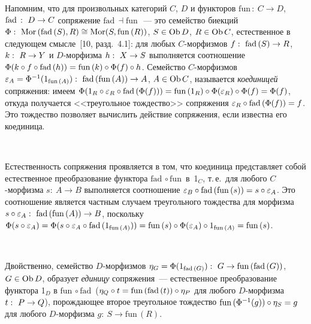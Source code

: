 \begin{multicols}{2}
 Напомним, что для произвольных категорий $C$, $D$ и функторов $\mathrm{fun}\,:\ C\to
D$, $\mathrm{fad}\,:\ D \hm\to C$ сопряжение $\mathrm{fad}\, \dashv \mathrm{fun}\,$~--- это семейство биекций
$\Phi:\ \mathrm{Mor}\,(\mathrm{fad}\,(S), R) \hm\cong \mathrm{Mor}(S, \mathrm{fun}\,(R))$, $S \hm\in
\mathrm{Ob}\, D$, $R\hm\in \mathrm{Ob}\, C$, естественное в следующем
смысле~[10, разд.~4.1]: для любых $C$-мор\-физ\-мов $f:\ \mathrm{fad}\,(S) \hm\to R$,
$k:\ R \hm\to
Y$ и $D$-мор\-физ\-ма $h:\ X \hm\to S$ выполняется соотношение $\Phi (k \circ f
\circ \mathrm{fad}\,(h)) \hm= \mathrm{fun}\,(k) \circ \Phi (f) \circ h$.
Семейство \mbox{$C$-мор}\-физ\-мов
$\varepsilon_A\hm= \Phi^{-1}(1_{\mathrm{fun}\,(A)}):\ \mathrm{fad}\,(\mathrm{fun}\,(A)) \hm\to A$, $A\hm\in
\mathrm{Ob}\, C$, называется \textit{коединицей} сопряжения: имеем $\Phi (1_R
\circ \varepsilon_R\circ \mathrm{fad}\,(\Phi (f))) \hm= \mathrm{fun}\,(1_R) \circ \Phi (\varepsilon_R) \circ
\Phi (f) \hm= \Phi (f)$, откуда получается <<треугольное тождество>>
сопряжения $\varepsilon_R \circ \mathrm{fad}\,(\Phi (f)) \hm= f$. Это тождество позволяет
вычислить действие сопряжения, если известна его коединица.

\vspace*{-6pt}
 \begin{center}
 \mbox{%
 \epsfxsize=44.07mm
 }
 \end{center}
 \vspace*{-6pt}


 Естественность сопряжения проявляется в том, что коединица представляет
собой естественное преобразование функтора $\mathrm{fad}\, \circ \mathrm{fun}\,$ в~1$_C$, т.\,е.\ для
любого $C$-мор\-физ\-ма $s:\ A \to B$ выполняется соотношение $\varepsilon_B
\circ \mathrm{fad}\,(\mathrm{fun}\,(s)) \hm= s \circ \varepsilon_A$. Это соотношение является частным
случаем треугольного тождества для морфизма $s \circ \varepsilon_A:\
\mathrm{fad}\,(\mathrm{fun}\,(A)) \hm\to B$, поскольку $\Phi (s \circ \varepsilon_A) \hm= \Phi (s \circ
\varepsilon_A \circ \mathrm{fad}\,(1_{\mathrm{fun}\,(A)})) \hm= \mathrm{fun}\,(s) \circ \Phi (\varepsilon_A) \circ
1_{\mathrm{fun}\,(A)}\hm = \mathrm{fun}\,(s)$.


\vspace*{-6pt}
 \begin{center}
 \mbox{%
 \epsfxsize=52.863mm
 }
 \end{center}
 \vspace*{-6pt}


 Двойственно, семейство $D$-мор\-физ\-мов $\eta_G \hm= \Phi (1_{\mathrm{fad}\,(G)}):\ G
\hm\to \mathrm{fun}\,(\mathrm{fad}\,(G))$, $G\hm\in \mathrm{Ob}\, D$, образует \textit{единицу}
сопряжения~--- естественное преобразование функтора 1$_D$ в $\mathrm{fun}\, \circ \mathrm{fad}\,$
($\eta_Q \circ t \hm= \mathrm{fun}\,(\mathrm{fad}\,(t)) \circ \eta_P$ для любого $D$-мор\-физ\-ма $t:\
P\hm\to Q$), порождающее второе треугольное тождество $\mathrm{fun}\,(\Phi^{-1}(g))
\circ \eta_S \hm= g$ для любого $D$-мор\-физ\-ма $g:\ S \to \mathrm{fun}\,(R)$.


\end{multicols}
